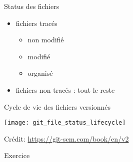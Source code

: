 \documentclass[unknownkeysallowed]{beamer}
\begin{document}
\begin{frame}{Status des fichiers}

\begin{itemize}
  \item fichiers tracés 
  \begin{itemize}
    \vspace{0.7cm}

    \item non modifié 
    \vspace{0.7cm}

    \item modifié 
    \vspace{0.7cm}

    \item organisé 
  \end{itemize}

\vspace{1.3cm}

  \item fichiers non tracés : tout le reste

\end{itemize}

\end{frame}


\begin{frame}{Cycle de vie des fichiers versionnés}

\begin{center}

\texttt{[image: git\_file\_status\_lifecycle]}

Crédit: \url{https://git-scm.com/book/en/v2}
\end{center}

\end{frame}


\begin{frame}{Exercice}


\end{frame}
\end{document}
